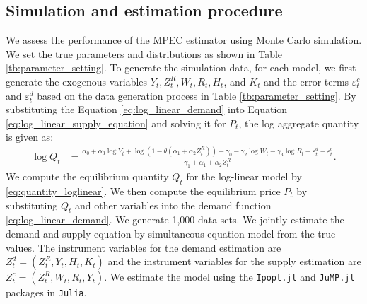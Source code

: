 \documentclass[11pt, a4paper]{article}
\begin{document}
\subsection{Simulation and estimation procedure}
We assess the performance of the MPEC estimator using Monte Carlo simulation.
We set the true parameters and distributions as shown in Table \ref{tb:parameter_setting}. 
To generate the simulation data, for each model, we first generate the exogenous variables $Y_t, Z^{R}_{t}, W_t, R_{t}, H_t$, and $K_t$ and the error terms $\varepsilon_{t}^c$ and $\varepsilon_{t}^d$ based on the data generation process in Table \ref{tb:parameter_setting}.
By substituting the Equation \eqref{eq:log_linear_demand} into Equation \eqref{eq:log_linear_supply_equation} and solving it for $P_{t}$, the log aggregate quantity is given as: 
\begin{align}
    \log Q_t &= \frac{ \alpha_0 + \alpha_3 \log Y_t + \log (1 - \theta (\alpha_1 + \alpha_2 Z^{R}_{t})) - \gamma_0  -  \gamma_2 \log W_{t} - \gamma_3 \log R_t + \varepsilon^{d}_{t} - \varepsilon^{c}_{t}}{\gamma_1+ \alpha_1 + \alpha_2 Z^{R}_{t} }.\label{eq:quantity_loglinear}
\end{align}
We compute the equilibrium quantity $Q_{t}$ for the log-linear model by \eqref{eq:quantity_loglinear}.
We then compute the equilibrium price $P_t$ by substituting $Q_{t}$ and other variables into the demand function \eqref{eq:log_linear_demand}.
We generate 1,000 data sets.
We jointly estimate the demand and supply equation by simultaneous equation model from the true values.
The instrument variables for the demand estimation are $Z^{d}_{t} = (Z^{R}_{t}, Y_t, H_{t}, K_{t})$ and the instrument variables for the supply estimation are $Z^{c}_{t} = (Z^{R}_{t}, W_{t}, R_{t}, Y_t)$. 
We estimate the model using the \texttt{Ipopt.jl} and \texttt{JuMP.jl} packages in \texttt{Julia}.
\end{document}
